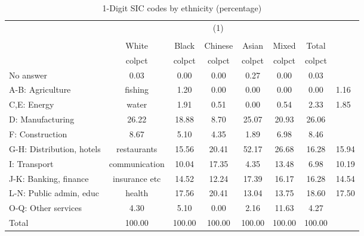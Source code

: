 \begin{table}[htbp]\centering
\def\sym#1{\ifmmode^{#1}\else\(^{#1}\)\fi}
\caption{1-Digit SIC codes by ethnicity (percentage)}
\begin{tabular}{l*{6}{c}}
\hline\hline
          &                                    \\
          &                                       \\
          &    White&    Black&  Chinese&    Asian&    Mixed&    Total\\
          &   colpct&   colpct&   colpct&   colpct&   colpct&   colpct\\
\hline
No answer &     0.03&     0.00&     0.00&     0.27&     0.00&     0.03\\
A-B: Agriculture & fishing&     1.20&     0.00&     0.00&     0.00&     0.00&     1.16\\
C,E: Energy & water&     1.91&     0.51&     0.00&     0.54&     2.33&     1.85\\
D: Manufacturing&    26.22&    18.88&     8.70&    25.07&    20.93&    26.06\\
F: Construction&     8.67&     5.10&     4.35&     1.89&     6.98&     8.46\\
G-H: Distribution, hotels & restaurants&    15.56&    20.41&    52.17&    26.68&    16.28&    15.94\\
I: Transport & communication&    10.04&    17.35&     4.35&    13.48&     6.98&    10.19\\
J-K: Banking, finance & insurance etc&    14.52&    12.24&    17.39&    16.17&    16.28&    14.54\\
L-N: Public admin, educ & health&    17.56&    20.41&    13.04&    13.75&    18.60&    17.50\\
O-Q: Other services&     4.30&     5.10&     0.00&     2.16&    11.63&     4.27\\
Total     &   100.00&   100.00&   100.00&   100.00&   100.00&   100.00\\
\hline\hline
\end{tabular}
\end{table}
